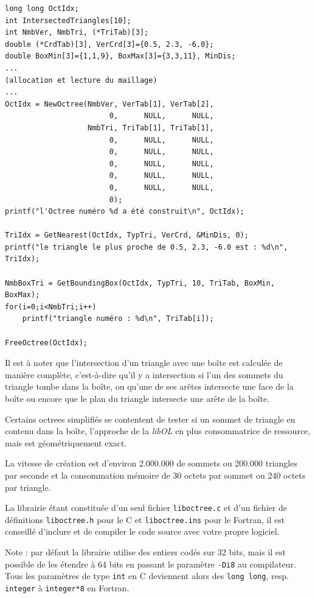 \documentclass[a4paper,12pt]{article}
\begin{document}
\begin{tt}
\begin{verbatim}
long long OctIdx;
int IntersectedTriangles[10];
int NmbVer, NmbTri, (*TriTab)[3];
double (*CrdTab)[3], VerCrd[3]={0.5, 2.3, -6.0};
double BoxMin[3]={1,1,9}, BoxMax[3]={3,3,11}, MinDis;
...
(allocation et lecture du maillage)
...
OctIdx = NewOctree(NmbVer, VerTab[1], VerTab[2],
                        0,      NULL,      NULL,
                   NmbTri, TriTab[1], TriTab[1],
                        0,      NULL,      NULL,
                        0,      NULL,      NULL,
                        0,      NULL,      NULL,
                        0,      NULL,      NULL,
                        0,      NULL,      NULL,
                        0);
printf("l'Octree numéro %d a été construit\n", OctIdx);

TriIdx = GetNearest(OctIdx, TypTri, VerCrd, &MinDis, 0);
printf("le triangle le plus proche de 0.5, 2.3, -6.0 est : %d\n", TriIdx);

NmbBoxTri = GetBoundingBox(OctIdx, TypTri, 10, TriTab, BoxMin, BoxMax);
for(i=0;i<NmbTri;i++)
    printf("triangle numéro : %d\n", TriTab[i]);

FreeOctree(OctIdx);
\end{verbatim}
\end{tt}
\normalfont

Il est à noter que l'intersection d'un triangle avec une boîte est calculée de manière complète, c'est-à-dire qu'il y a intersection si l'un des sommets du triangle tombe dans la boîte, ou  qu’une de ses arêtes intersecte une face de la boîte ou encore que le plan du triangle intersecte une arête de la boîte.

Certains octrees simplifiés se contentent de tester si un sommet de triangle en contenu dans la boîte, l'approche de la \emph{libOL} en plus consommatrice de ressource, mais est géométriquement exact.

La vitesse de création est d'environ 2.000.000 de sommets ou 200.000 triangles par seconde et la consommation mémoire de 30 octets par sommet ou 240 octets par triangle.

La librairie étant constituée d'un seul fichier {\tt liboctree.c} et d'un fichier de définitions {\tt liboctree.h} pour le C et {\tt liboctree.ins} pour le Fortran, il est conseillé d'inclure et de compiler le code source avec votre propre logiciel.

Note : par défaut la librairie utilise des entiers codés sur 32 bits, mais il est possible de les étendre à 64 bits en passant le paramètre {\tt -Di8} au compilateur. Tous les paramètres de type {\tt int} en C deviennent alors des {\tt long long}, resp. {\tt integer} à {\tt integer*8} en Fortran.
\end{document}
